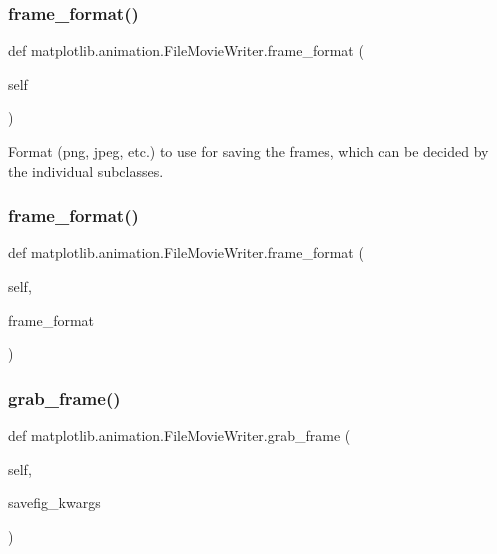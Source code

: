 \subsubsection{\texorpdfstring{frame\+\_\+format()}{frame\_format()}\hspace{0.1cm}{\footnotesize\ttfamily [1/2]}}
{\footnotesize\ttfamily def matplotlib.\+animation.\+File\+Movie\+Writer.\+frame\+\_\+format (\begin{DoxyParamCaption}\item[{}]{self }\end{DoxyParamCaption})}

\begin{DoxyVerb}Format (png, jpeg, etc.) to use for saving the frames, which can be
decided by the individual subclasses.
\end{DoxyVerb}
 \mbox{\label{classmatplotlib_1_1animation_1_1FileMovieWriter_ae600d710b822c37ccea5bbfbc60dd7fd}} 
\subsubsection{\texorpdfstring{frame\+\_\+format()}{frame\_format()}\hspace{0.1cm}{\footnotesize\ttfamily [2/2]}}
{\footnotesize\ttfamily def matplotlib.\+animation.\+File\+Movie\+Writer.\+frame\+\_\+format (\begin{DoxyParamCaption}\item[{}]{self,  }\item[{}]{frame\+\_\+format }\end{DoxyParamCaption})}

\mbox{\label{classmatplotlib_1_1animation_1_1FileMovieWriter_a65039273557da2aec53f08944ad4e388}} 
\subsubsection{\texorpdfstring{grab\+\_\+frame()}{grab\_frame()}}
{\footnotesize\ttfamily def matplotlib.\+animation.\+File\+Movie\+Writer.\+grab\+\_\+frame (\begin{DoxyParamCaption}\item[{}]{self,  }\item[{}]{savefig\+\_\+kwargs }\end{DoxyParamCaption})}

